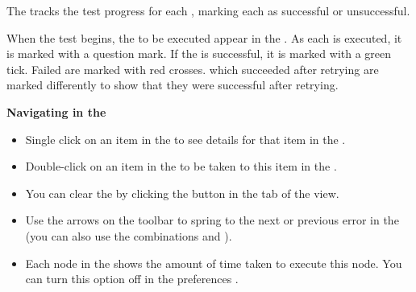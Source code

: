 % 
%
%

The \gdtestresultview{}  tracks the test progress for each \gdsuite{}, marking each \gdstep{} as successful or unsuccessful.

When the test begins, the \gdsteps{} to be executed appear in the \gdtestresultview{}. As each \gdstep{} is executed, it is marked with a question mark. If the \gdstep{} is successful, it is marked with a green tick. Failed \gdsteps{} are marked with red crosses. \gdsteps{} which succeeded after retrying  are marked differently to show that they were successful after retrying. 

\textbf{Navigating in the \gdtestresultview{}}\\
\begin{itemize}
\item Single click on an item in the \gdtestresultview{} to see details for that item in the \gdpropview{}.
\item Double-click on an item in the \gdtestresultview{} to be taken to this item in the \gdsuite{}. 
\item You can clear the \gdtestresultview{} by clicking the  button in the tab of the view. 
\item Use the arrows on the toolbar to spring to the next or previous error in the \gdtestresultview{} (you can also use the combinations  and ).
\item Each node in the \gdtestresultview{} shows the amount of time taken to execute this node. You can turn this option off in the preferences .
\end{itemize}

